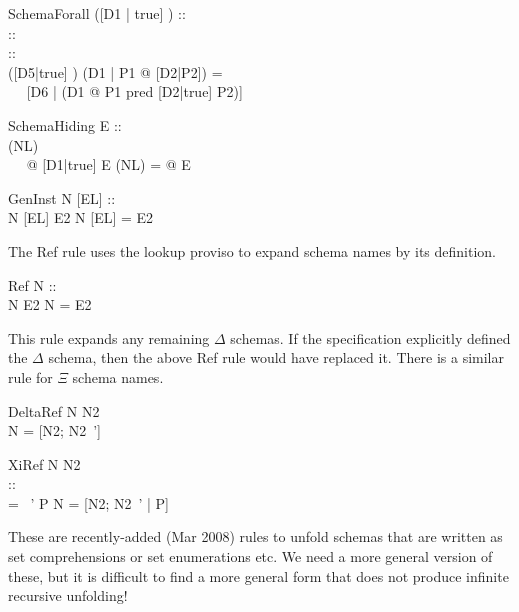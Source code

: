 \begin{zedrule}{SchemaForall}
   ([D1 | true] \land [D2 | true]) :: \power [D3 | true] \\
   [D1|true] :: \power [D4|true] \\
   [D2|true] :: \power [D5|true] \\
   ([D5|true] \schemaminus [D4|true]) \is [D6|true]
\derives
   (\forall D1 | P1 @ [D2|P2]) = {}\\~~ [D6 | (\forall D1 @ P1 \land pred [D2|true] \land P2)]
\end{zedrule}

\begin{zedrule}{SchemaHiding}
  E ::\power [D1| true] \\
  [D1|true] \hide (NL) \is {}\\~~ \exists [D2|true] @ [D1|true]
\derives
  E \hide (NL) = \exists [D2|true] @ E
\end{zedrule}


\begin{zedrule}{GenInst}
  N [EL] :: \power [D | true] \\
  N [EL] \hasDefn E2
\derives
  N [EL] = E2
\end{zedrule}

The Ref rule uses the lookup proviso to expand schema names by its
definition.

\begin{zedrule}{Ref}
  N :: \power [D | true] \\
  N \hasDefn E2
\derives
  N = E2
\end{zedrule}

This rule expands any remaining $\Delta$ schemas.  If the
specification explicitly defined the $\Delta$ schema, then the above
Ref rule would have replaced it.  There is a similar rule for $\Xi$
schema names.

\begin{zedrule}{DeltaRef}
  \Delta \unprefix N \is N2 \\
\derives
  N = [N2; N2~']
\end{zedrule}

\begin{zedrule}{XiRef}
  \Xi \unprefix N \is N2 \\
  [N2|true] :: \power [D2 | true] \\
  \theta [D2|true] = \theta [D2|true]~' \iff P
\derives
  N = [N2; N2~' | P]
\end{zedrule}

These are recently-added (Mar 2008) rules to unfold schemas that
are written as set comprehensions or set enumerations etc.
We need a more general version of these, but it is difficult to find 
a more general form that does not produce infinite recursive unfolding!

